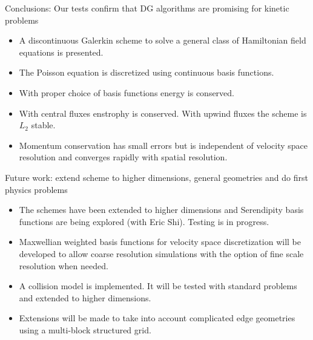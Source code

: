 \documentclass[pdf]{beamer}
\theoremstyle{definition}
\begin{document}
\begin{frame}{Conclusions: Our tests confirm that DG algorithms are
    promising for kinetic problems}%

  \begin{itemize}
  \item A discontinuous Galerkin scheme to solve a general class of
    Hamiltonian field equations is presented.
  \item The Poisson equation is discretized using continuous basis
    functions.
  \item With proper choice of basis functions energy is
    conserved. 
  \item With central fluxes enstrophy is conserved. With upwind fluxes
    the scheme is $L_2$ stable.
  \item Momentum conservation has small errors but is independent of
    velocity space resolution and converges rapidly with spatial
    resolution.
  \end{itemize}

\end{frame}

\begin{frame}{Future work: extend scheme to higher dimensions, general
    geometries and do first physics problems}%

  \begin{itemize}
    \small
  \item The schemes have been extended to higher dimensions and
    Serendipity basis functions are being explored (with Eric
    Shi). Testing is in progress.
  \item Maxwellian weighted basis functions for velocity space
    discretization will be developed to allow coarse resolution
    simulations with the option of fine scale resolution when needed.
  \item A collision model is implemented. It will be tested with
    standard problems and extended to higher dimensions.
  \item Extensions will be made to take into account complicated edge
    geometries using a multi-block structured grid.
  \end{itemize}
\end{frame}
\end{document}
